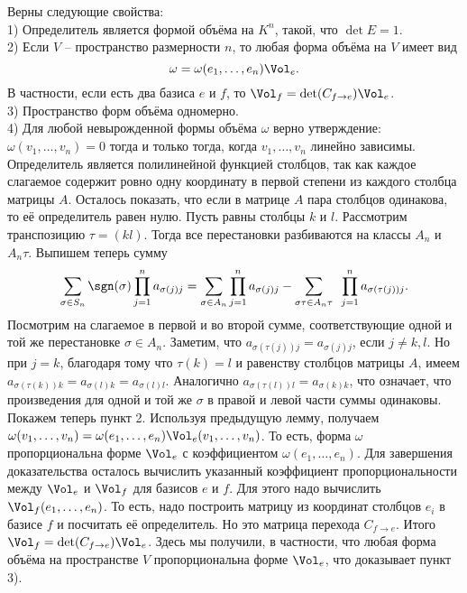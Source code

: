 \begin{thm} Верны следующие свойства:\\
1) Определитель является формой объёма на $K^n$, такой, что $\det E=1$.\\
2) Если $V$ -- пространство размерности $n$, то любая форма объёма на $V$ имеет вид $$\omega=\omega(e_1,\dots,e_n)\Vol_e.$$
В частности, если есть два базиса $e$ и $f$, то $\Vol_{f}=\det(C_{f \to e}) \Vol_{e}$.\\
3) Пространство форм объёма одномерно.\\
4) Для любой невырожденной формы объёма $\omega$ верно утверждение: $\omega(v_1,\dots,v_n)=0$ тогда и только тогда, когда $v_1,\dots,v_n$ линейно зависимы.
\proof Определитель является полилинейной функцией столбцов, так как  каждое слагаемое содержит ровно одну координату в первой степени из каждого столбца матрицы $A$. Осталось показать, что если в матрице $A$ пара столбцов одинакова, то её определитель равен нулю.
Пусть равны столбцы $k$ и $l$. Рассмотрим транспозицию $\tau=(kl)$. Тогда все перестановки разбиваются на классы $A_n$ и $A_n\tau$. Выпишем теперь сумму
$$\sum_{\sigma \in S_n} \sgn(\sigma)\prod_{j=1}^n a_{\sigma(j)j} = \sum_{\sigma \in A_n} \prod_{j=1}^n a_{\sigma(j)j}- \sum_{\sigma\tau \in A_n\tau}\,\,\, \prod_{j=1}^n a_{\sigma(\tau(j))j}.$$
Посмотрим на слагаемое в первой и во второй сумме, соответствующие одной и той же перестановке $\sigma \in A_n$. Заметим, что $a_{\sigma(\tau(j))j}=a_{\sigma(j)j}$, если $j\neq k,l$. Но при  $j=k$, благодаря тому что $\tau(k)=l$  и равенству столбцов матрицы $A$, имеем $a_{\sigma(\tau(k))k}=a_{\sigma(l)k}=a_{\sigma(l)l}$. Аналогично $a_{\sigma(\tau(l))l}=a_{\sigma(k)k}$, что означает, что произведения для одной и той же $\sigma$ в правой и левой части суммы одинаковы.\\

Покажем теперь пункт 2. Используя предыдущую лемму, получаем $\omega(v_1,\dots,v_n)=\omega(e_1,\dots,e_n)\Vol_e(v_1,\dots,v_n)$. То есть, форма $\omega$ пропорциональна форме $\Vol_e$ с коэффициентом $\omega(e_1,\dots,e_n)$. Для завершения доказательства осталось вычислить указанный коэффициент пропорциональности между $\Vol_e$ и $\Vol_f$ для базисов $e$ и $f$. Для этого надо вычислить $\Vol_f(e_1,\dots,e_n)$. То есть, надо построить матрицу из координат столбцов $e_i$ в базисе $f$ и посчитать её определитель. Но это матрица перехода $C_{f\to e}$. Итого $\Vol_{f}=\det(C_{f\to e}) \Vol_{e}$. Здесь мы получили, в частности, что любая форма объёма на пространстве $V$  пропорциональна форме $\Vol_e$, что доказывает пункт 3).



\end{thm}
